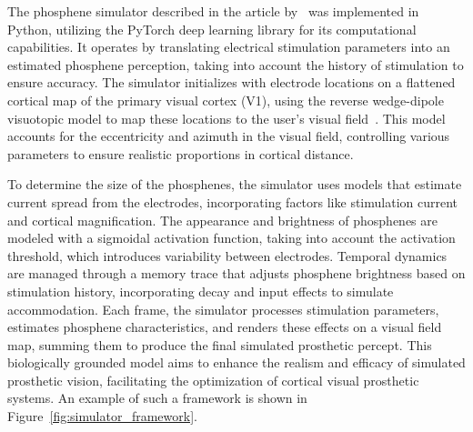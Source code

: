 \documentclass[10pt]{article}
\begin{document}
The phosphene simulator described in the article
by~\textcite{deruytervansteveninckEndtoendOptimizationProsthetic2022} was
implemented in Python, utilizing the PyTorch deep learning library for its
computational capabilities. It operates by translating electrical stimulation
parameters into an estimated phosphene perception, taking into account the
history of stimulation to ensure accuracy. The simulator initializes with
electrode locations on a flattened cortical map of the primary visual cortex
(V1), using the reverse wedge-dipole visuotopic model to map these locations to
the user's visual field~\parencite{liWearableComputerVision2013}. This model
accounts for the eccentricity and azimuth in the visual field, controlling
various parameters to ensure realistic proportions in cortical distance.

To determine the size of the phosphenes, the simulator uses models that estimate
current spread from the electrodes, incorporating factors like stimulation
current and cortical magnification. The appearance and brightness of phosphenes
are modeled with a sigmoidal activation function, taking into account the
activation threshold, which introduces variability between electrodes. Temporal
dynamics are managed through a memory trace that adjusts phosphene brightness
based on stimulation history, incorporating decay and input effects to simulate
accommodation. Each frame, the simulator processes stimulation parameters,
estimates phosphene characteristics, and renders these effects on a visual field
map, summing them to produce the final simulated prosthetic percept. This
biologically grounded model aims to enhance the realism and efficacy of
simulated prosthetic vision, facilitating the optimization of cortical visual
prosthetic systems. An example of such a framework is shown in Figure~\ref{fig:simulator_framework}.
\end{document}
